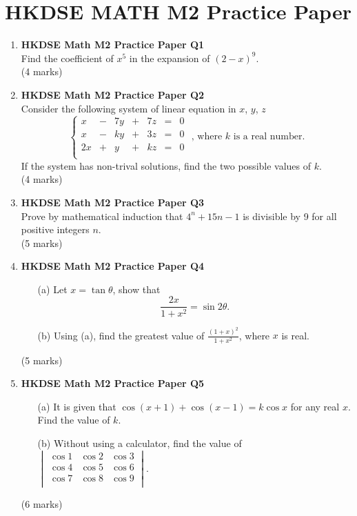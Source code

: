 \documentclass{report}
\begin{document}
\chapter{HKDSE MATH M2 Practice Paper}
\begin{enumerate}
	\item \textbf{HKDSE Math M2 Practice Paper Q1}\\
	Find the coefficient of $x^5$ in the expansion of $(2-x)^9$. \\(4 marks)

	\item \textbf{HKDSE Math M2 Practice Paper Q2}\\
	Consider the following system of linear equation in $x$, $y$, $z$
	$$\left\{\begin{matrix}
		x & - & 7y & + & 7z & = & 0\\
		x & - & ky & + & 3z & = & 0\\
		2x & + & y & + & kz & = & 0\\
	\end{matrix}\right.\text{ , where }k\text{ is a real number.}$$
	If the system has non-trival solutions, find the two possible values of $k$. \\(4 marks)

	\item \textbf{HKDSE Math M2 Practice Paper Q3}\\
	Prove by mathematical induction that $4^n+15n - 1$ is divisible by 9 for all positive integers $n$. \\(5 marks)		

	\item \textbf{HKDSE Math M2 Practice Paper Q4}
	\begin{enumerate}
		\item [(a)]Let $x = \tan{\theta}$, show that $$\displaystyle\frac{2x}{1+x^2} = \sin{2\theta}.$$ 
		\item [(b)]Using (a), find the greatest value of $\displaystyle\frac{(1+x)^2}{1+x^2}$, where $x$ is real.
	\end{enumerate}
	(5 marks)

	\item \textbf{HKDSE Math M2 Practice Paper Q5}
	\begin{enumerate}
		\item [(a)]It is given that $\cos{(x+1)} + \cos{(x-1)} = k\cos{x}$ for any real $x$. Find the value of $k$. 
		\item [(b)]Without using a calculator, find the value of $\begin{vmatrix}
			\cos{1} & \cos{2} & \cos{3}\\
			\cos{4} & \cos{5} & \cos{6}\\
			\cos{7} & \cos{8} & \cos{9}\\
		\end{vmatrix}$.
	\end{enumerate}
	(6 marks)


\end{enumerate}
\end{document}
